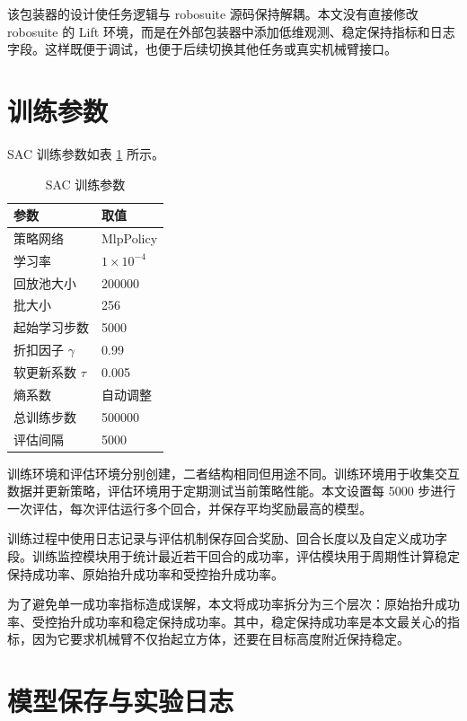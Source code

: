 \documentclass[
    type = bachelor,
    oneside,
    fontset = fandol
]{njuthesis}
\begin{document}
该包装器的设计使任务逻辑与 robosuite 源码保持解耦。本文没有直接修改 robosuite 的 Lift 环境，而是在外部包装器中添加低维观测、稳定保持指标和日志字段。这样既便于调试，也便于后续切换其他任务或真实机械臂接口。

\section{训练参数}

SAC 训练参数如表 \ref{tab:sac-config} 所示。

\begin{table}[htbp]
  \centering
  \caption{SAC 训练参数}
  \label{tab:sac-config}
  \begin{tabular}{ll}
    \toprule
    参数 & 取值 \\
    \midrule
    策略网络 & MlpPolicy \\
    学习率 & $1\times10^{-4}$ \\
    回放池大小 & 200000 \\
    批大小 & 256 \\
    起始学习步数 & 5000 \\
    折扣因子 $\gamma$ & 0.99 \\
    软更新系数 $\tau$ & 0.005 \\
    熵系数 & 自动调整 \\
    总训练步数 & 500000 \\
    评估间隔 & 5000 \\
    \bottomrule
  \end{tabular}
\end{table}

训练环境和评估环境分别创建，二者结构相同但用途不同。训练环境用于收集交互数据并更新策略，评估环境用于定期测试当前策略性能。本文设置每 5000 步进行一次评估，每次评估运行多个回合，并保存平均奖励最高的模型。

训练过程中使用日志记录与评估机制保存回合奖励、回合长度以及自定义成功字段。训练监控模块用于统计最近若干回合的成功率，评估模块用于周期性计算稳定保持成功率、原始抬升成功率和受控抬升成功率。

为了避免单一成功率指标造成误解，本文将成功率拆分为三个层次：原始抬升成功率、受控抬升成功率和稳定保持成功率。其中，稳定保持成功率是本文最关心的指标，因为它要求机械臂不仅抬起立方体，还要在目标高度附近保持稳定。

\section{模型保存与实验日志}
\end{document}
